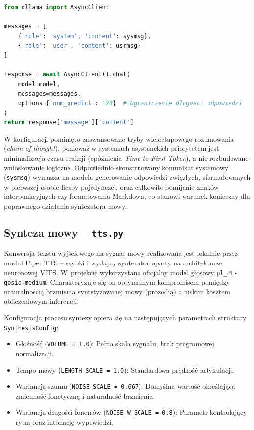 \documentclass[12pt,a4paper]{article}
\begin{document}
\begin{center}
\begin{minipage}{0.85\textwidth}
\begin{lstlisting}[language=Python]
from ollama import AsyncClient

messages = [
    {'role': 'system', 'content': sysmsg},
    {'role': 'user', 'content': usrmsg}
]

response = await AsyncClient().chat(
    model=model, 
    messages=messages, 
    options={'num_predict': 128}  # Ograniczenie dlugosci odpowiedzi
)
return response['message']['content']
\end{lstlisting}
\end{minipage}
\end{center}

W konfiguracji pominięto zaawansowane tryby wieloetapowego rozumowania (\textit{chain-of-thought}), ponieważ w systemach asystenckich priorytetem jest minimalizacja czasu reakcji (opóźnienia \textit{Time-to-First-Token}), a nie rozbudowane wnioskowanie logiczne. Odpowiednio skonstruowany komunikat systemowy (\texttt{sysmsg}) wymusza na modelu generowanie odpowiedzi zwięzłych, sformułowanych w pierwszej osobie liczby pojedynczej, oraz całkowite pomijanie znaków interpunkcyjnych czy formatowania Markdown, co stanowi warunek konieczny dla poprawnego działania syntezatora mowy.

\subsection{Synteza mowy – \texttt{tts.py}}
Konwersja tekstu wyjściowego na sygnał mowy realizowana jest lokalnie przez moduł Piper TTS – szybki i wydajny syntezator oparty na architekturze neuronowej VITS. W~projekcie wykorzystano oficjalny model głosowy \texttt{pl\_PL-gosia-medium}. Charakteryzuje się on optymalnym kompromisem pomiędzy naturalnością brzmienia syntetyzowanej mowy (prozodią) a niskim kosztem obliczeniowym inferencji.

Konfiguracja procesu syntezy opiera się na następujących parametrach struktury \texttt{SynthesisConfig}:
\begin{itemize}
    \item Głośność (\texttt{VOLUME = 1.0}): Pełna skala sygnału, brak programowej normalizacji.
    \item Tempo mowy (\texttt{LENGTH\_SCALE = 1.0}): Standardowa prędkość artykulacji.
    \item Wariancja szumu (\texttt{NOISE\_SCALE = 0.667}): Domyślna wartość określająca zmienność fonetyczną i naturalność brzmienia.
    \item Wariancja długości fonemów (\texttt{NOISE\_W\_SCALE = 0.8}): Parametr kontrolujący rytm oraz intonację wypowiedzi.
\end{itemize}
\end{document}
